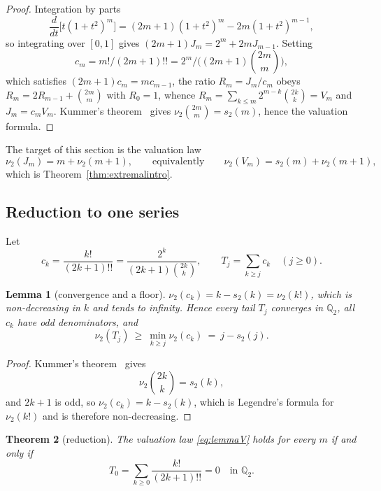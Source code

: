 \documentclass[10pt,a4paper]{amsart}
\newtheorem{theorem}{Theorem}[section]
\newtheorem{lemma}[theorem]{Lemma}
\newcommand{\Qt}{\mathbb Q_2}
\begin{document}
\begin{proof}
Integration by parts
\[
\frac{d}{dt}\bigl[t(1+t^2)^m\bigr]=(2m+1)(1+t^2)^m-2m(1+t^2)^{m-1}, 
\]
so integrating over $[0,1]$ gives $(2m+1)J_m=2^m+2mJ_{m-1}$.  Setting 
\[
c_m=m!/(2m+1)!!=2^m/\bigl((2m+1)\binom{2m}m\bigr), 
\]
which satisfies $(2m+1)c_m=mc_{m-1}$, the ratio $R_m=J_m/c_m$ obeys $R_m=2R_{m-1}+\binom{2m}m$ with $R_0=1$, whence $R_m=\sum_{k\le m}2^{m-k}\binom{2k}k=V_m$ and $J_m=c_mV_m$.  Kummer's theorem~\cite{Kummer,Mihet,Koblitz} gives $\nu_2\binom{2m}m=s_2(m)$, hence
the valuation formula.
\end{proof}

The target of this section is the valuation law
\begin{equation}\label{eq:lemmaV}
  \nu_2(J_m)=m+\nu_2(m+1),\qquad\text{equivalently}\qquad   \nu_2(V_m)=s_2(m)+\nu_2(m+1),
\end{equation}
which is Theorem~\ref{thm:extremalintro}.

\subsection{Reduction to one series}

Let
\[
  c_k=\frac{k!}{(2k+1)!!}=\frac{2^k}{(2k+1)\binom{2k}k},\qquad
  T_j=\sum_{k\ge j}c_k\quad(j\ge0).
\]

\begin{lemma}[convergence and a floor]\label{lem:conv}
$\nu_2(c_k)=k-s_2(k)=\nu_2(k!)$, which is non-decreasing in $k$ and tends to infinity.  Hence every tail $T_j$ converges in $\Qt$, all $c_k$ have odd
denominators, and
\[
  \nu_2(T_j)\ \ge\ \min_{k\ge j}\nu_2(c_k)\ =\ j-s_2(j).
\]
\end{lemma}

\begin{proof}
Kummer's theorem~\cite{Kummer,Mihet,Koblitz} gives 
\[
\nu_2\binom{2k}k=s_2(k), 
\]
and $2k+1$ is odd, so $\nu_2(c_k)=k-s_2(k)$, which is Legendre's formula for $\nu_2(k!)$ and is therefore non-decreasing.
\end{proof}

\begin{theorem}[reduction]\label{thm:Freduction}
The valuation law \eqref{eq:lemmaV} holds for every $m$ if and only if
\[
  T_0=\sum_{k\ge0}\frac{k!}{(2k+1)!!}=0\quad\text{in }\Qt .
\]
\end{theorem}
\end{document}
